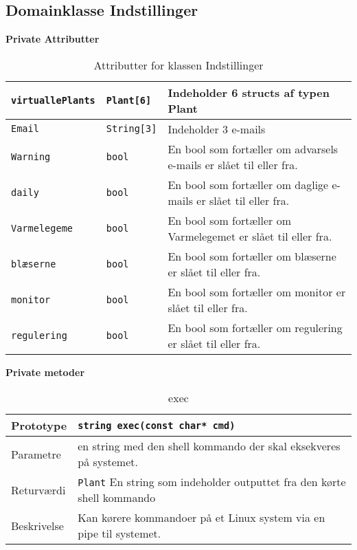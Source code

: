 \subsection{Domainklasse Indstillinger}

\textbf{Private Attributter}

\begin{table}[h]
\begin{tabularx}{\textwidth}{| >{\raggedright\arraybackslash}X | >{\raggedright\arraybackslash}X | >{\raggedright\arraybackslash}p{10 cm} |} \hline
\texttt{virtuallePlants} & \texttt{Plant[6]} & Indeholder 6 structs af typen Plant \\\hline
\texttt{Email} & \texttt{String[3]} & Indeholder 3 e-mails \\\hline
\texttt{Warning} & \texttt{bool} & En bool som fortæller om advarsels e-mails er slået til eller fra.\\\hline
\texttt{daily} & \texttt{bool} & En bool som fortæller om daglige e-mails er slået til eller fra. \\\hline
\texttt{Varmelegeme} & \texttt{bool} & En bool som fortæller om Varmelegemet er slået til eller fra.\\\hline
\texttt{blæserne} & \texttt{bool} & En bool som fortæller om blæserne er slået til eller fra. \\\hline
\texttt{monitor} & \texttt{bool} & En bool som fortæller om monitor er slået til eller fra. \\\hline
\texttt{regulering} & \texttt{bool} & En bool som fortæller om regulering er slået til eller fra. \\\hline
\end{tabularx}
\caption{Attributter for klassen Indstillinger}
\label{table:Indstillinger_attributter}
\end{table}

\textbf{Private metoder}

\begin{table}[h]
\begin{tabularx}{\textwidth}{| >{\raggedright\arraybackslash}p{2.5 cm} | >{\raggedright\arraybackslash}X |} \hline
Prototype & \texttt{string exec(const char* cmd)} \\\hline
Parametre & en string med den shell kommando der skal eksekveres på systemet. \\\hline
Returværdi & \texttt{Plant} \newline
En string som indeholder outputtet fra den kørte shell kommando \\\hline
Beskrivelse & Kan kørere kommandoer på et Linux system via en pipe til systemet. \\\hline
\end{tabularx}
\caption{exec}
\label{table:exec}
\end{table}

